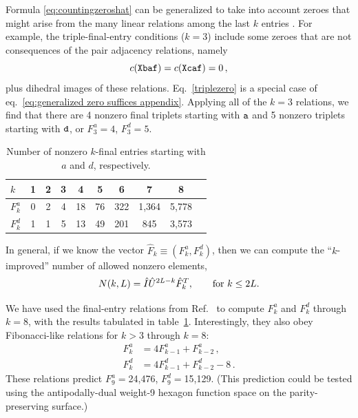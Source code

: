 \documentclass[12pt]{article}
\begin{document}
Formula \eqref{eq:countingzeroshat} can be generalized to take into account
zeroes that might arise from the many linear relations among the last $k$ entries \citep{Dixon:2022rse}.
For example, the triple-final-entry conditions ($k=3$) 
include some zeroes that are not consequences of the pair adjacency relations, namely
%
\begin{equation}
c({\tt X baf}) = c({\tt Xcaf}) = 0\,,
\label{triplezero}
\end{equation}
%
plus dihedral images of these relations.  Eq.~\eqref{triplezero} is a special case of eq.\ \eqref{eq:generalized zero suffices appendix}.
Applying all of the $k=3$ relations, we find that there are 4 nonzero final triplets starting with ${\tt a}$ and 5 nonzero triplets starting with ${\tt d}$, or $F_3^a = 4$, $F_3^d = 5$.
%
\begin{table}[t]
    \small
    \centering
    \begin{tabular}{lccccccccc}
        \toprule
      $k$  & 1 & 2 & 3 & 4 & 5 & 6 & 7 & 8  \\
        \midrule
        $F_k^a$ & 0 & 2 & 4 & 18 & 76 & 322 & 1,364 & 5,778\\
        $F_k^d$ & 1 & 1 & 5 & 13 & 49 & 201 & 845 & 3,573\\
       \bottomrule
    \end{tabular}
    \caption{\small Number of nonzero $k$-final entries starting with $a$ and $d$, respectively.}
    \label{tab:F_k_count}
\end{table}
In general, if we know the vector
$\hat{F}_k \equiv (F_k^a,F_k^d)$, then we can compute the ``$k$-improved'' number of allowed nonzero elements, 
%
\begin{equation}
N(k,L) = \hat{I} \hat{U}^{2L-k} \hat{F}_k^T , \qquad \hbox{for $k\leq 2L$}.
\label{eq:NkL}
\end{equation}
%

We have used the final-entry relations from Ref.\ \citep{Dixon:2022rse} to compute $F_k^a$ and $F_k^d$ through $k=8$, with the results tabulated in table~\ref{tab:F_k_count}.  Interestingly, they also obey Fibonacci-like relations for $k>3$ through $k=8$:
%
\begin{equation}
\begin{split}
F_k^a &= 4 F_{k-1}^a + F_{k-2}^a \,,  \\
F_k^d &= 4 F_{k-1}^d + F_{k-2}^d - 8 \,. 
\end{split}
\label{eq:Fkad_recur}
\end{equation}
%
These relations predict $F_9^a = $24,476, $F_9^d = $15,129.  (This prediction could be tested using the antipodally-dual weight-9 hexagon function space on the parity-preserving surface.)
\end{document}
